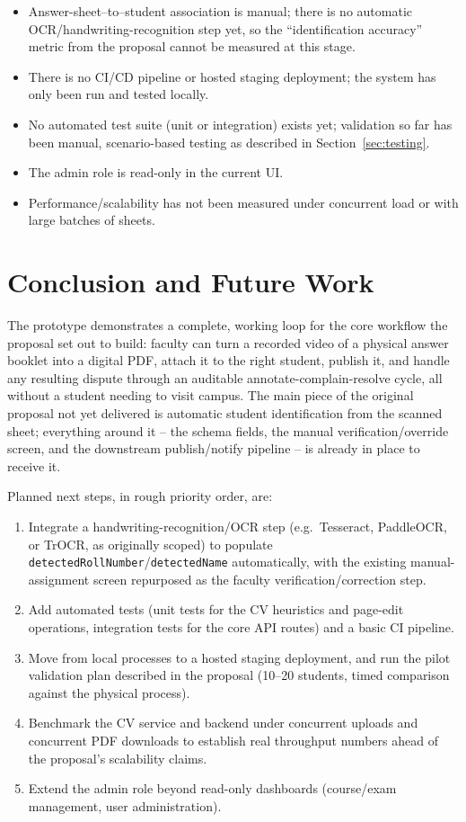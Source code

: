 \documentclass[11pt,a4paper]{article}
\begin{document}
\begin{itemize}[leftmargin=0.7cm]
  \item Answer-sheet–to–student association is manual; there is no automatic
    OCR/handwriting-recognition step yet, so the ``identification accuracy''
    metric from the proposal cannot be measured at this stage.
  \item There is no CI/CD pipeline or hosted staging deployment; the system
    has only been run and tested locally.
  \item No automated test suite (unit or integration) exists yet; validation
    so far has been manual, scenario-based testing as described in
    Section~\ref{sec:testing}.
  \item The admin role is read-only in the current UI.
  \item Performance/scalability has not been measured under concurrent load
    or with large batches of sheets.
\end{itemize}

\section{Conclusion and Future Work}

The prototype demonstrates a complete, working loop for the core workflow the
proposal set out to build: faculty can turn a recorded video of a physical
answer booklet into a digital PDF, attach it to the right student, publish
it, and handle any resulting dispute through an auditable
annotate-complain-resolve cycle, all without a student needing to visit
campus. The main piece of the original proposal not yet delivered is
automatic student identification from the scanned sheet; everything around
it -- the schema fields, the manual verification/override screen, and the
downstream publish/notify pipeline -- is already in place to receive it.

Planned next steps, in rough priority order, are:

\begin{enumerate}[leftmargin=0.7cm]
  \item Integrate a handwriting-recognition/OCR step (e.g.\ Tesseract,
    PaddleOCR, or TrOCR, as originally scoped) to populate
    \texttt{detectedRollNumber}/\texttt{detectedName} automatically, with the
    existing manual-assignment screen repurposed as the faculty
    verification/correction step.
  \item Add automated tests (unit tests for the CV heuristics and page-edit
    operations, integration tests for the core API routes) and a basic CI
    pipeline.
  \item Move from local processes to a hosted staging deployment, and run the
    pilot validation plan described in the proposal (10--20 students,
    timed comparison against the physical process).
  \item Benchmark the CV service and backend under concurrent uploads and
    concurrent PDF downloads to establish real throughput numbers ahead of
    the proposal's scalability claims.
  \item Extend the admin role beyond read-only dashboards (course/exam
    management, user administration).
\end{enumerate}
\end{document}

